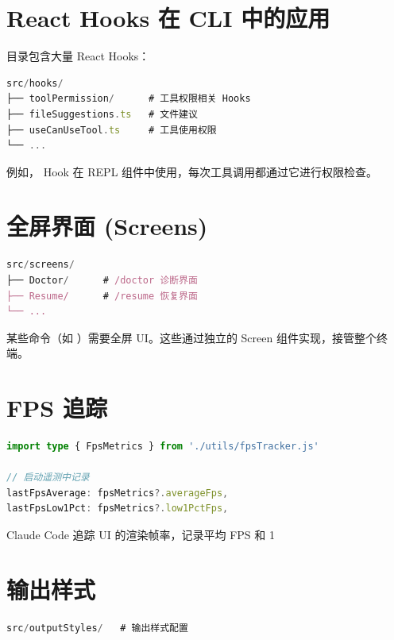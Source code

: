 \section{React Hooks 在 CLI 中的应用}

 目录包含大量 React Hooks：

\begin{lstlisting}[language=TypeScript,breaklines=true]
src/hooks/
├── toolPermission/      # 工具权限相关 Hooks
├── fileSuggestions.ts   # 文件建议
├── useCanUseTool.ts     # 工具使用权限
└── ...
\end{lstlisting}

例如， Hook 在 REPL 组件中使用，每次工具调用都通过它进行权限检查。

\section{全屏界面 (Screens)}

\begin{lstlisting}[language=TypeScript,breaklines=true]
src/screens/
├── Doctor/      # /doctor 诊断界面
├── Resume/      # /resume 恢复界面
└── ...
\end{lstlisting}

某些命令（如 ）需要全屏 UI。这些通过独立的 Screen 组件实现，接管整个终端。

\section{FPS 追踪}

\begin{lstlisting}[language=TypeScript,breaklines=true]
import type { FpsMetrics } from './utils/fpsTracker.js'

// 启动遥测中记录
lastFpsAverage: fpsMetrics?.averageFps,
lastFpsLow1Pct: fpsMetrics?.low1PctFps,
\end{lstlisting}

Claude Code 追踪 UI 的渲染帧率，记录平均 FPS 和 1%

\section{输出样式}

\begin{lstlisting}[language=TypeScript,breaklines=true]
src/outputStyles/   # 输出样式配置
\end{lstlisting}

